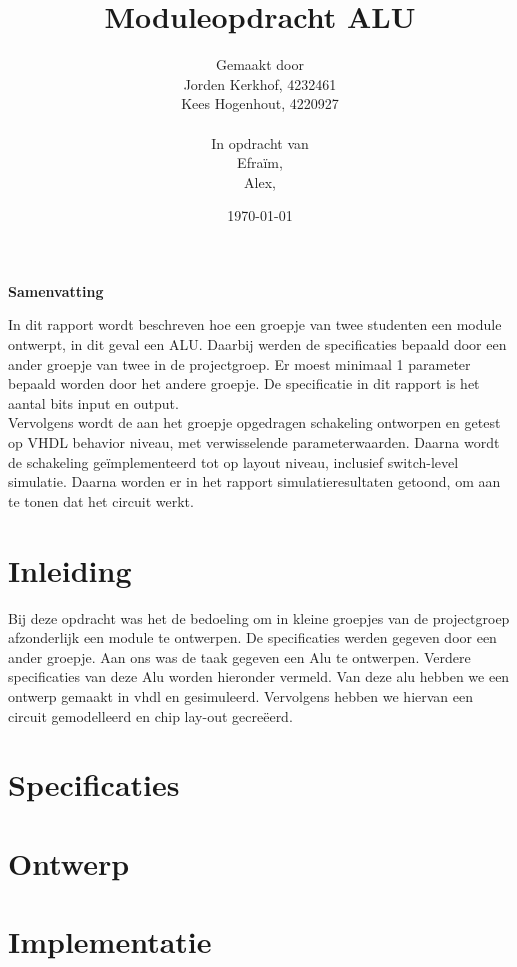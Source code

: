 \documentclass[11pt,twoside,a4paper]{article}
\title{Moduleopdracht ALU}
\author{
Gemaakt door\\
Jorden Kerkhof, 4232461\\
Kees Hogenhout, 4220927 \\
\\
In opdracht van \\
Efraïm, \\
Alex, \\
}
\date{\today}
\begin{document}
\maketitle
\thispagestyle{empty}
\vspace{30 mm}
\begin{center}
\Large \bf 
Samenvatting
\end{center}
In dit rapport wordt beschreven hoe een groepje van twee studenten een module ontwerpt, in dit geval een ALU. Daarbij werden de specificaties bepaald door een ander groepje van twee in de projectgroep. Er moest minimaal 1 parameter bepaald worden door het andere groepje. De specificatie in dit rapport is het aantal bits input en output.
 \\
Vervolgens  wordt de aan het groepje opgedragen schakeling ontworpen en getest op VHDL behavior niveau, met verwisselende parameterwaarden. Daarna wordt de schakeling geïmplementeerd tot op layout niveau, inclusief switch-level simulatie. 
Daarna worden er in het rapport simulatieresultaten getoond, om aan te tonen dat het circuit werkt. 
\clearpage

\tableofcontents
\clearpage

\section{Inleiding}
Bij deze opdracht was het de bedoeling om in kleine groepjes van de projectgroep afzonderlijk een module te ontwerpen. De specificaties werden gegeven door een ander groepje. Aan ons was de taak gegeven een Alu te ontwerpen. Verdere specificaties van deze Alu worden hieronder vermeld. Van deze  alu hebben we een ontwerp gemaakt in vhdl en gesimuleerd. Vervolgens hebben we hiervan een circuit gemodelleerd en chip lay-out gecreëerd. 

\section{Specificaties}
\scriptsize

\normalsize

\section{Ontwerp}


\section{Implementatie}

\end{document}
